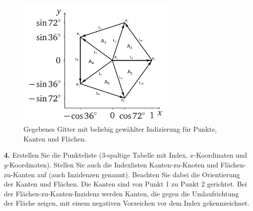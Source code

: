 \documentclass[Protokollheft.tex]{subfiles}
\begin{document}
\begin{figure}[h]
	\centering
	\includegraphics[width=0.7\textwidth]{Raster_2.png}
	\caption{Gegebenes Gitter mit beliebig gewählter Indizierung für Punkte, Kanten und Flächen.}
	\label{abb::5-eck}
\end{figure}

        \begin{framed}
	\noindent \textbf{4.} Erstellen Sie die Punkteliste (3-spaltige Tabelle mit Index, $x$-Koordinaten und $y$-Koordinaten). Stellen Sie auch die Indexlisten Kanten-zu-Knoten und Flächen-zu-Kanten auf (auch Inzidenzen genannt).
                    Beachten Sie dabei die Orientierung der Kanten und Flächen. Die Kanten sind von Punkt 1
                    zu Punkt 2 gerichtet. Bei der Flächen-zu-Kanten-Inzidenz werden Kanten, die gegen die
                    Umlaufrichtung der Fläche zeigen, mit einem negativen Vorzeichen vor dem Index gekennzeichnet.\label{exer:incidences}
\end{framed}
\end{document}
